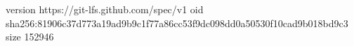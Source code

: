 version https://git-lfs.github.com/spec/v1
oid sha256:81906c37d773a19ad9b9c1f77a86cc53f9dc098dd0a50530f10cad9b018bd9c3
size 152946

